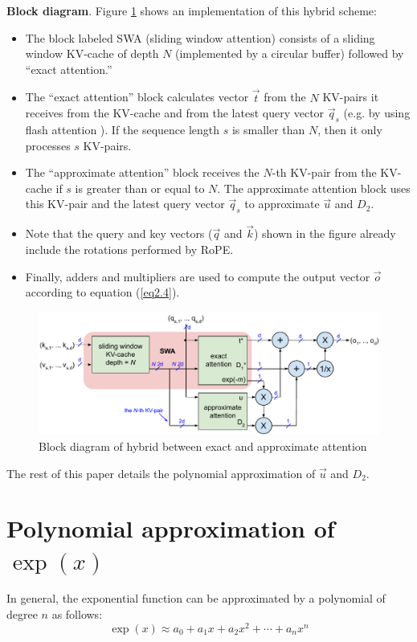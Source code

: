 \documentclass{article}
\numberwithin{equation}{section} %
\def\q{\vec{q}}
\def\k{\vec{k}}
\def\o{\vec{o}}
\def\t{\vec{t}}
\def\u{\vec{u}}
\begin{document}
\textbf{Block diagram}. Figure \ref{fig2} shows an implementation of this hybrid scheme:
\begin{itemize}[topsep=-1pt, itemsep=-1pt]
  \item The block labeled SWA (sliding window attention) consists of a sliding window KV-cache of depth $N$ (implemented by a circular buffer) followed by “exact attention.”
  \item The “exact attention” block calculates vector $\t$ from the $N$ KV-pairs it receives from the KV-cache and from the latest query vector $\q_s$ (e.g. by using flash attention \citep{flash-attention}). If the sequence length $s$ is smaller than $N$, then it only processes $s$ KV-pairs.
  \item The “approximate attention” block receives the $N$-th KV-pair from the KV-cache if $s$ is greater than or equal to $N$. The approximate attention block uses this KV-pair and the latest query vector $\q_s$ to approximate $\u$ and $D_2$.
  \item Note that the query and key vectors ($\q$ and $\k$) shown in the figure already include the rotations performed by RoPE.
  \item Finally, adders and multipliers are used to compute the output vector $\o$ according to equation (\ref{eq2.4}).
\end{itemize}

\begin{figure}[h!] \centering  %
  \includegraphics[scale=0.86]{figs/approximate_fig2.pdf}
  \caption{Block diagram of hybrid between exact and approximate attention}
\label{fig2} \end{figure}

The rest of this paper details the polynomial approximation of $\u$ and $D_2$.

\section{Polynomial approximation of $\exp(x)$}
In general, the exponential function can be approximated by a polynomial of degree $n$ as follows:
\begin{equation}
  \exp(x) \approx a_0 + a_1 x + a_2 x^2 + \cdots + a_n x^n
\end{equation}
\end{document}
